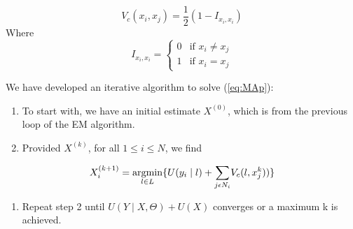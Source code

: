 \begin{equation}
V_c(x_i,x_j) = \frac{1}{2}(1-I_{x_i,x_i})
\end{equation}
Where
\begin{equation}
I_{x_i,x_i}=
\begin{cases} 
0 & \text{if } x_i\neq x_j \\
1      & \text{if } x_i= x_j 
\end{cases}
\end{equation}

We have developed an iterative algorithm to solve (\ref{eq:MAp}):


\begin{enumerate}
	\item To start with, we have an initial estimate \(X^(0)\), which is from the previous loop of the EM algorithm. 
	\item Provided \(X^{(k)}\), for all \(1\leq i \leq N\), we find
\end{enumerate}

\begin{equation}
X^{(k+1)}_i=\operatorname*{argmin}_{l \in L} \{U( y_i \mid l) + {\sum\limits_{j \epsilon N_i}}V_c(l,x^k_j))\}
\end{equation}

\begin{enumerate}
	\item Repeat step 2 until \(U( Y \mid X, \Theta) + U(X)\) converges or a maximum k is achieved.
\end{enumerate}


